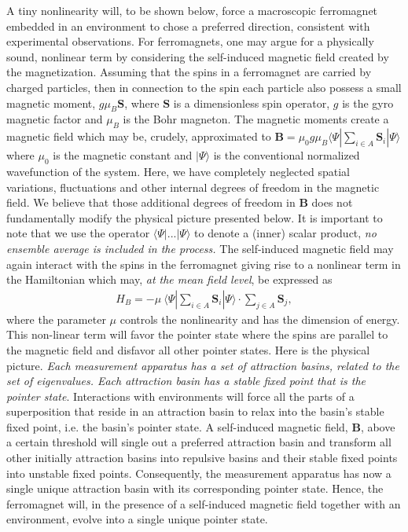 \documentclass[showpacs,preprintnumbers,amsmath,amssymb,12pt]{revtex4-2}
\begin{document}
A tiny nonlinearity will, to be shown below, force a macroscopic
ferromagnet embedded in an environment to chose a preferred direction,
consistent with experimental observations. For ferromagnets, one may
argue for a physically sound, nonlinear term by considering the
self-induced magnetic field created by the magnetization. Assuming
that the spins in a ferromagnet are carried by charged particles, then
in connection to the spin each particle also possess a small magnetic
moment, $g \mu_B \mathbf{S}$, where $\mathbf{S}$ is a dimensionless
spin operator, $g$ is the gyro magnetic factor and $\mu_B$ is the Bohr
magneton. The magnetic moments create a magnetic field which may be,
crudely, approximated to $\mathbf{B} = \mu_0 g \mu_B \langle \Psi |
\sum_{i \in A} \mathbf{S}_i | \Psi \rangle$ where $\mu_0$ is the
magnetic constant and $|\Psi \rangle$ is the conventional normalized
wavefunction of the system. Here, we have completely neglected spatial
variations, fluctuations and other internal degrees of freedom in the
magnetic field. We believe that those additional degrees of freedom in
$\boldsymbol{B}$ does not fundamentally modify the physical picture
presented below. It is important to note that we use the operator
$\langle \Psi |...| \Psi \rangle$ to denote a (inner) scalar product,
{\em no ensemble average is included in the process.}  The
self-induced magnetic field may again interact with the spins in the
ferromagnet giving rise to a nonlinear term in the Hamiltonian which
may, {\em at the mean field level}, be expressed as
\begin{eqnarray}
  H_{B} = - \mu ~ \langle \Psi | \sum_{i \in A} \mathbf{S}_i | 
  \Psi \rangle \cdot \sum_{j \in A} \mathbf{S}_j,
\label{HMagn}
\end{eqnarray}
where the parameter $\mu$ controls the nonlinearity and has the
dimension of energy.  This non-linear term will favor the pointer
state where the spins are parallel to the magnetic field and disfavor
all other pointer states. Here is the physical picture. {\em Each
  measurement apparatus has a set of attraction basins, related to the
  set of eigenvalues. Each attraction basin has a stable fixed point
  that is the pointer state}. Interactions with environments will
force all the parts of a superposition that reside in an attraction
basin to relax into the basin's stable fixed point, i.e. the basin's
pointer state. A self-induced magnetic field, $\mathbf{B}$, above a
certain threshold will single out a preferred attraction basin and
transform all other initially attraction basins into repulsive basins
and their stable fixed points into unstable fixed
points. Consequently, the measurement apparatus has now a single
unique attraction basin with its corresponding pointer state. Hence,
the ferromagnet will, in the presence of a self-induced magnetic field
together with an environment, evolve into a single unique pointer
state.
\end{document}
